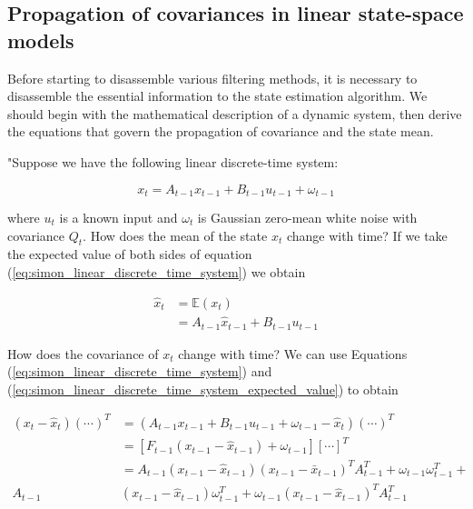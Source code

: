 \subsection{Propagation of covariances in linear state-space models}
Before starting to disassemble various filtering methods, it is necessary to disassemble the essential information to the state estimation algorithm. We should begin with the mathematical description of a dynamic system, then derive the equations that govern the propagation of covariance and the state mean.

{\em

"Suppose we have the following linear discrete-time system:

\begin{equation}
x_t = A_{t-1}x_{t-1} + B_{t-1}u_{t-1} + \omega_{t-1}
\label{eq:simon_linear_discrete_time_system}
\end{equation}

\noindent where \(u_t\) is a known input and \(\omega_t\) is Gaussian zero-mean white noise with covariance \(Q_t\). How does the mean of the state \(x_t\) change with time? If we take the expected value of both sides of equation (\ref{eq:simon_linear_discrete_time_system}) we obtain

\begin{equation}
\begin{aligned}
\hat{x}_t &= \mathbb{E}(x_t)\\
          &= A_{t-1}\hat{x}_{t-1} + B_{t-1}u_{t-1}
\label{eq:simon_linear_discrete_time_system_expected_value}
\end{aligned}
\end{equation}

How does the covariance of \(x_t\) change with time? We can use Equations (\ref{eq:simon_linear_discrete_time_system})
and (\ref{eq:simon_linear_discrete_time_system_expected_value}) to obtain

\begin{equation}
\begin{aligned}
\left(x_t-\hat{x}_t\right)(\cdots)^T &=\left(A_{t-1} x_{t-1}+B_{t-1} u_{t-1}+\omega_{t-1}-\hat{x}_t\right)(\cdots)^T \\
&=\left[F_{t-1}\left(x_{t-1}-\hat{x}_{t-1}\right)+\omega_{t-1}\right][\cdots]^T \\
&=A_{t-1}\left(x_{t-1}-\hat{x}_{t-1}\right)\left(x_{t-1}-\bar{x}_{t-1}\right)^T A_{t-1}^T+\omega_{t-1} \omega_{t-1}^T+\\
A_{t-1} &\left(x_{t-1}-\hat{x}_{t-1}\right) \omega_{t-1}^T+\omega_{t-1}\left(x_{t-1}-\hat{x}_{t-1}\right)^T A_{t-1}^T
\label{eq:simon_linear_discrete_time_system_covariance}
\end{aligned}    
\end{equation}

}
